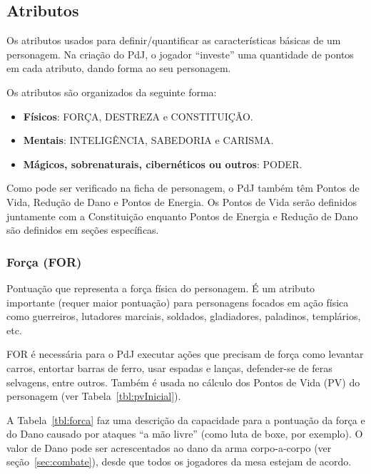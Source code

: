 \subsection{\label{subsecAtributos}Atributos}
Os atributos usados para definir/quantificar as características básicas de um personagem. Na criação do PdJ, o jogador ``investe'' uma quantidade de pontos em cada atributo, dando forma ao seu personagem.

Os atributos são organizados da seguinte forma:
\begin{itemize}
	\item \textbf{Físicos}: FORÇA, DESTREZA e CONSTITUIÇÃO.
	\item \textbf{Mentais}: INTELIGÊNCIA, SABEDORIA e CARISMA.
	\item \textbf{Mágicos, sobrenaturais, cibernéticos ou outros}: PODER.
\end{itemize}

Como pode ser verificado na ficha de personagem, o PdJ também têm Pontos de Vida, Redução de Dano e Pontos de Energia. Os Pontos de Vida serão definidos juntamente com a Constituição enquanto Pontos de Energia e Redução de Dano são definidos em seções específicas.

\subsubsection*{Força (FOR)}

Pontuação que representa a força física do personagem. É um atributo importante (requer maior pontuação) para personagens focados em ação física como guerreiros, lutadores marciais, soldados, gladiadores, paladinos, templários, etc.

FOR é necessária para o PdJ executar ações que precisam de força como levantar carros, entortar barras de ferro, usar espadas e lanças, defender-se de feras selvagens, entre outros. Também é usada no cálculo dos Pontos de Vida (PV) do personagem (ver Tabela~\ref{tbl:pvInicial}).

A Tabela~\ref{tbl:forca} faz uma descrição da capacidade para a pontuação da força e do Dano causado por ataques ``a mão livre'' (como luta de boxe, por exemplo). O valor de Dano pode ser acrescentados ao dano da arma corpo-a-corpo (ver seção~\ref{sec:combate}), desde que todos os jogadores da mesa estejam de acordo.

